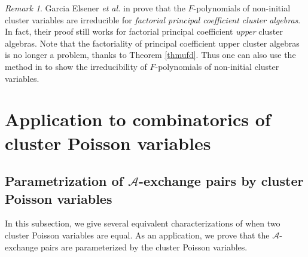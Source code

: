 \documentclass{amsart}
\theoremstyle{definition}
\theoremstyle{remark}
\newtheorem{remark}[theorem]{Remark}
\numberwithin{equation}{section}
\begin{document}
\begin{remark}
Garcia Elsener {\em et al.} in \cite[Theorem 3.9]{GLS19} prove that the $F$-polynomials of non-initial cluster variables are irreducible for {\em factorial principal coefficient cluster algebras}. In fact, their proof still works for factorial principal coefficient {\em upper} cluster algebras. Note that the factoriality of principal coefficient upper cluster algebras is no longer a problem, thanks to Theorem \ref{thmufd}. Thus one can also use the method in \cite{GLS19} to show the irreducibility of $F$-polynomials of non-initial cluster variables.
\end{remark}

\section{Application to combinatorics of cluster Poisson variables}\label{sec7}

\subsection{Parametrization of \texorpdfstring{$\mathscr A$}{Lg}-exchange pairs by cluster Poisson variables}\label{sec71}
 In this subsection, we give several equivalent characterizations of when two cluster Poisson variables are equal. As an application, we prove that the $\mathscr A$-exchange pairs are parameterized by the cluster Poisson variables.
\end{document}
